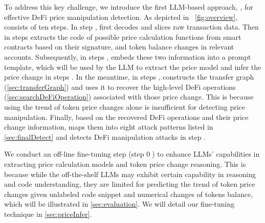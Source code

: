 To address this key challenge, we introduce the first LLM-based approach, \name, for effective DeFi price manipulation detection.
As depicted in \myfig~\ref{fig:overview}, \name consists of ten steps.
In step , \name first decodes and slices raw transaction data.
Then in steps  
\name extracts the code of possible price calculation functions from smart contracts based on their signature, and token balance changes in relevant accounts.
Subsequently, in steps , \name embeds these two information into a prompt template, which will be used by the LLM to extract the price model and infer the price change in steps  .
In the meantime, in steps  , \name constructs the transfer graph (\mysec\ref{sec:transferGraph}) and uses it to recover the high-level DeFi operations (\mysec\ref{sec:searchDeFiOperation}) associated with those price change.
This is because using the trend of token price changes alone is insufficient for detecting price manipulation.
Finally, based on the recovered DeFi operations and their price change information, \name maps them into eight attack patterns listed in \mysec\ref{sec:finalDetect} and detects DeFi manipulation attacks in step .

We conduct an off-line fine-tuning step (step \textcircled{0})
to enhance LLMs' capabilities in extracting price calculation models and token price change reasoning.
This is because while the off-the-shelf LLMs may exhibit certain capability in reasoning and code understanding, they are limited for predicting the trend of token price changes given unlabeled code snippet and numerical changes of tokens balance, which will be illustrated in \mysec\ref{sec:evaluation}.
We will detail our fine-tuning technique in \mysec\ref{sec:priceInfer}. 
